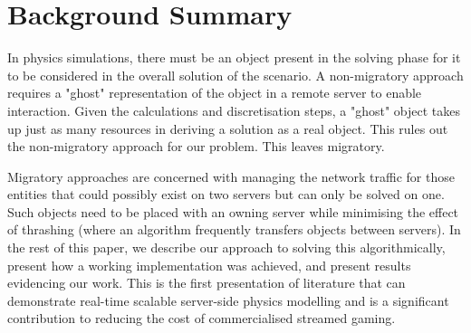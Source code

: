 \section{Background Summary}
In physics simulations, there must be an object present in the solving phase for it to be considered in the overall solution of the scenario. A non-migratory approach requires a "ghost" representation of the object in a remote server to enable interaction. Given the calculations and discretisation steps, a "ghost" object takes up just as many resources in deriving a solution as a real object. This rules out the non-migratory approach for our problem. This leaves migratory.

Migratory approaches are concerned with managing the network traffic for those entities that could possibly exist on two servers but can only be solved on one. Such objects need to be placed with an owning server while minimising the effect of thrashing (where an algorithm frequently transfers objects between servers). In the rest of this paper, we describe our approach to solving this algorithmically, present how a working implementation was achieved, and present results evidencing our work. This is the first presentation of literature that can demonstrate real-time scalable server-side physics modelling and is a significant contribution to reducing the cost of commercialised streamed gaming.


